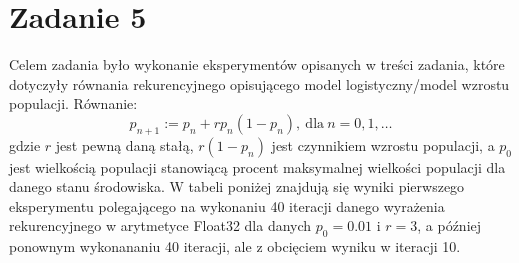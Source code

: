 \documentclass[]{article}
\begin{document}
	\section*{Zadanie 5}
	Celem zadania było wykonanie eksperymentów opisanych w treści zadania, które dotyczyły równania rekurencyjnego opisującego model logistyczny/model wzrostu populacji. Równanie:
	$$p_{n+1} := p_n + rp_n(1-p_n), \ \textrm{dla} \ n = 0, 1, \dots$$
	gdzie $r$ jest pewną daną stałą, $r(1-p_n)$ jest czynnikiem wzrostu populacji, a $p_0$ jest wielkością populacji stanowiącą procent maksymalnej wielkości populacji dla danego stanu środowiska.
	W tabeli poniżej znajdują się wyniki pierwszego eksperymentu polegającego na wykonaniu 40 iteracji danego wyrażenia rekurencyjnego w arytmetyce Float32 dla danych $p_0 = 0.01$ i $r = 3$, a później ponownym wykonananiu 40 iteracji, ale z obcięciem wyniku w iteracji 10.
\end{document}
